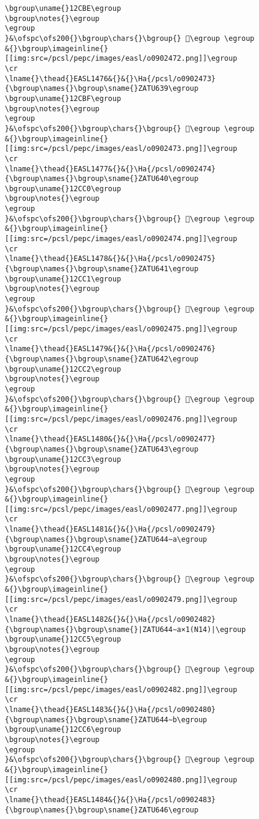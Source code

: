 \begin{verbatim}
\bgroup\uname{}12CBE\egroup
\bgroup\notes{}\egroup
\egroup
}&\ofspc\ofs200{}\bgroup\chars{}\bgroup{} 𒲾\egroup \egroup
&{}\bgroup\imageinline{}[[img:src=/pcsl/pepc/images/easl/o0902472.png]]\egroup
\cr
\lname{}\thead{}EASL1476&{}&{}\Ha{/pcsl/o0902473}{\bgroup\names{}\bgroup\sname{}ZATU639\egroup
\bgroup\uname{}12CBF\egroup
\bgroup\notes{}\egroup
\egroup
}&\ofspc\ofs200{}\bgroup\chars{}\bgroup{} 𒲿\egroup \egroup
&{}\bgroup\imageinline{}[[img:src=/pcsl/pepc/images/easl/o0902473.png]]\egroup
\cr
\lname{}\thead{}EASL1477&{}&{}\Ha{/pcsl/o0902474}{\bgroup\names{}\bgroup\sname{}ZATU640\egroup
\bgroup\uname{}12CC0\egroup
\bgroup\notes{}\egroup
\egroup
}&\ofspc\ofs200{}\bgroup\chars{}\bgroup{} 𒳀\egroup \egroup
&{}\bgroup\imageinline{}[[img:src=/pcsl/pepc/images/easl/o0902474.png]]\egroup
\cr
\lname{}\thead{}EASL1478&{}&{}\Ha{/pcsl/o0902475}{\bgroup\names{}\bgroup\sname{}ZATU641\egroup
\bgroup\uname{}12CC1\egroup
\bgroup\notes{}\egroup
\egroup
}&\ofspc\ofs200{}\bgroup\chars{}\bgroup{} 𒳁\egroup \egroup
&{}\bgroup\imageinline{}[[img:src=/pcsl/pepc/images/easl/o0902475.png]]\egroup
\cr
\lname{}\thead{}EASL1479&{}&{}\Ha{/pcsl/o0902476}{\bgroup\names{}\bgroup\sname{}ZATU642\egroup
\bgroup\uname{}12CC2\egroup
\bgroup\notes{}\egroup
\egroup
}&\ofspc\ofs200{}\bgroup\chars{}\bgroup{} 𒳂\egroup \egroup
&{}\bgroup\imageinline{}[[img:src=/pcsl/pepc/images/easl/o0902476.png]]\egroup
\cr
\lname{}\thead{}EASL1480&{}&{}\Ha{/pcsl/o0902477}{\bgroup\names{}\bgroup\sname{}ZATU643\egroup
\bgroup\uname{}12CC3\egroup
\bgroup\notes{}\egroup
\egroup
}&\ofspc\ofs200{}\bgroup\chars{}\bgroup{} 𒳃\egroup \egroup
&{}\bgroup\imageinline{}[[img:src=/pcsl/pepc/images/easl/o0902477.png]]\egroup
\cr
\lname{}\thead{}EASL1481&{}&{}\Ha{/pcsl/o0902479}{\bgroup\names{}\bgroup\sname{}ZATU644∼a\egroup
\bgroup\uname{}12CC4\egroup
\bgroup\notes{}\egroup
\egroup
}&\ofspc\ofs200{}\bgroup\chars{}\bgroup{} 𒳄\egroup \egroup
&{}\bgroup\imageinline{}[[img:src=/pcsl/pepc/images/easl/o0902479.png]]\egroup
\cr
\lname{}\thead{}EASL1482&{}&{}\Ha{/pcsl/o0902482}{\bgroup\names{}\bgroup\sname{}|ZATU644∼a×1(N14)|\egroup
\bgroup\uname{}12CC5\egroup
\bgroup\notes{}\egroup
\egroup
}&\ofspc\ofs200{}\bgroup\chars{}\bgroup{} 𒳅\egroup \egroup
&{}\bgroup\imageinline{}[[img:src=/pcsl/pepc/images/easl/o0902482.png]]\egroup
\cr
\lname{}\thead{}EASL1483&{}&{}\Ha{/pcsl/o0902480}{\bgroup\names{}\bgroup\sname{}ZATU644∼b\egroup
\bgroup\uname{}12CC6\egroup
\bgroup\notes{}\egroup
\egroup
}&\ofspc\ofs200{}\bgroup\chars{}\bgroup{} 𒳆\egroup \egroup
&{}\bgroup\imageinline{}[[img:src=/pcsl/pepc/images/easl/o0902480.png]]\egroup
\cr
\lname{}\thead{}EASL1484&{}&{}\Ha{/pcsl/o0902483}{\bgroup\names{}\bgroup\sname{}ZATU646\egroup

\end{verbatim}
